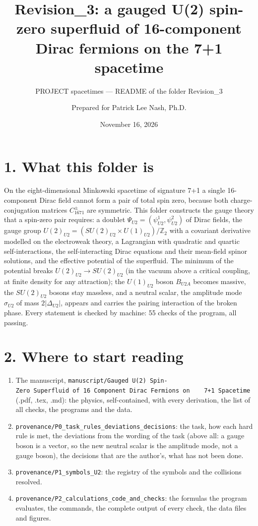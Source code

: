 \documentclass[
  10pt,
]{article}
\title{Revision\_3: a gauged U(2) spin-zero superfluid of 16-component
Dirac fermions on the 7+1 spacetime}
\subtitle{PROJECT spacetimes --- README of the folder Revision\_3}
\author{Prepared for Patrick Lee Nash, Ph.D.}
\date{November 16, 2026}
\providecommand{\tightlist}{%
  \setlength{\itemsep}{0pt}\setlength{\parskip}{0pt}}
\begin{document}
\maketitle

\hypertarget{what-this-folder-is}{%
\section{1. What this folder is}\label{what-this-folder-is}}

On the eight-dimensional Minkowski spacetime of signature 7+1 a single
16-component Dirac field cannot form a pair of total spin zero, because
both charge-conjugation matrices \(C^\pm_{1671}\) are symmetric. This
folder constructs the gauge theory that a spin-zero pair requires: a
doublet \(\Psi_{U2}=(\psi^1_{U2},\psi^2_{U2})\) of Dirac fields, the
gauge group \(U(2)_{U2}=(SU(2)_{U2}\times U(1)_{U2})/\mathbb Z_2\) with
a covariant derivative modelled on the electroweak theory, a Lagrangian
with quadratic and quartic self-interactions, the self-interacting Dirac
equations and their mean-field spinor solutions, and the effective
potential of the superfluid. The minimum of the potential breaks
\(U(2)_{U2}\to SU(2)_{U2}\) (in the vacuum above a critical coupling, at
finite density for any attraction); the \(U(1)_{U2}\) boson \(B_{U2A}\)
becomes massive, the \(SU(2)_{U2}\) bosons stay massless, and a neutral
scalar, the amplitude mode \(\sigma_{U2}\) of mass
\(2\lvert\Delta_{U2}\rvert\), appears and carries the pairing
interaction of the broken phase. Every statement is checked by machine:
55 checks of the program, all passing.

\hypertarget{where-to-start-reading}{%
\section{2. Where to start reading}\label{where-to-start-reading}}

\begin{enumerate}
\def\labelenumi{\arabic{enumi}.}
\tightlist
\item
  The manuscript,
  \texttt{manuscript/Gauged\ U(2)\ Spin-Zero\ Superfluid\ of\ 16\ Component\ Dirac\ Fermions\ on\ \ \ \ 7+1\ Spacetime}
  (.pdf, .tex, .md): the physics, self-contained, with every derivation,
  the list of all checks, the programs and the data.
\item
  \texttt{provenance/P0\_task\_rules\_deviations\_decisions}: the task,
  how each hard rule is met, the deviations from the wording of the task
  (above all: a gauge boson is a vector, so the new neutral scalar is
  the amplitude mode, not a gauge boson), the decisions that are the
  author's, what has not been done.
\item
  \texttt{provenance/P1\_symbols\_U2}: the registry of the symbols and
  the collisions resolved.
\item
  \texttt{provenance/P2\_calculations\_code\_and\_checks}: the formulas
  the program evaluates, the commands, the complete output of every
  check, the data files and figures.
\end{enumerate}
\end{document}
